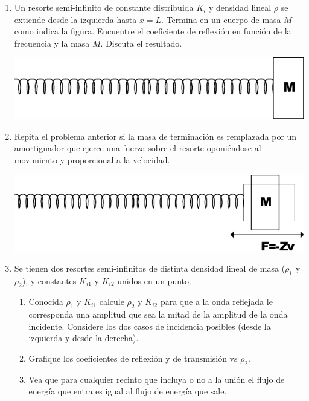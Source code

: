 \documentclass[11pt,spanish,a4paper]{article}
\begin{document}
\begin{enumerate}
\item Un resorte semi-infinito de constante distribuida \(K_i\) y densidad lineal \(\rho\) se extiende desde la izquierda hasta \(x=L\).
	Termina en un cuerpo de masa \(M\) como indica la figura.
	Encuentre el coeficiente de reflexión en función de la frecuencia y la masa \(M\).
	Discuta el resultado.
\begin{center}
	\includegraphics[width=0.45\linewidth]{g05e06}
\end{center}


\item Repita el problema anterior si la masa de terminación es remplazada por un amortiguador que
ejerce una fuerza sobre el resorte oponiéndose al movimiento y proporcional a la velocidad.
\begin{center}
	\includegraphics[width=0.45\linewidth]{g05e07}
\end{center}


\item  Se tienen dos resortes semi-infinitos de distinta densidad lineal de masa (\(\rho_1\) y \(\rho_2\)), y constantes \(K_{i1}\) y \(K_{i2}\) unidos en un punto.
	\begin{enumerate}
		\item Conocida \(\rho_1\) y \(K_{i1}\) calcule \(\rho_2\) y \(K_{i2}\) para que a la onda reflejada le corresponda una amplitud que sea la mitad de la amplitud de la onda incidente.
			Considere los dos casos de incidencia posibles (desde la izquierda y desde la derecha).
		\item Grafique los coeficientes de reflexión y de transmisión vs \(\rho_2\).
		\item Vea que para cualquier recinto que incluya o no a la unión el flujo de energía que entra es igual al flujo de energía que sale.
	\end{enumerate}



\end{enumerate}
\end{document}
